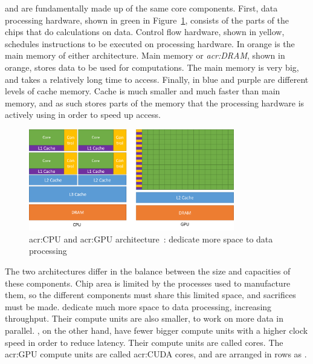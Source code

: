  and  are fundamentally made up of the same core components.
First, data processing hardware, shown in green in Figure~\ref{fig:cpu_gpu}, consists of the parts
of the chips that do calculations on data. Control flow hardware, shown in yellow, schedules
instructions to be executed on processing hardware. In orange is the main memory of either
architecture. Main memory or \textit{\acrfull{acr:DRAM}}, shown in orange, stores data to be used
for computations. The main memory is very big, and takes a relatively long time to access. Finally,
in blue and purple are different levels of cache memory. Cache is much smaller and much faster than
main memory, and as such stores parts of the memory that the processing hardware is actively using
in order to speed up access.

\begin{figure}[H]
    \centering
    \includegraphics[width=0.8\textwidth]{Chapter_graphics_processing_units/media/gpu-devotes-more-transistors-to-data-processing}
    \caption{\Acrshort{acr:CPU} and \acrshort{acr:GPU} architecture~\cite{Nvidia2021}:  dedicate more space to data processing}\label{fig:cpu_gpu}
\end{figure}

The two architectures differ in the balance between the size and capacities of these components.
Chip area is limited by the processes used to manufacture them, so the different components must
share this limited space, and sacrifices must be made.  dedicate much more space
to data processing, increasing throughput. Their compute units are also smaller, to work on more
data in parallel. , on the other hand, have fewer bigger compute units with a
higher clock speed in order to reduce latency. Their compute units are called cores. The
\acrshort{acr:GPU} compute units are called \acrshort{acr:CUDA} cores, and are arranged in rows as
\textit{}.

